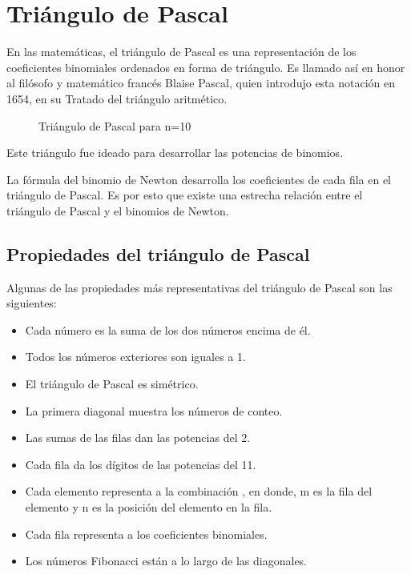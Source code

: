 \section{Triángulo de Pascal}

En las matemáticas, el triángulo de Pascal es una representación de los
coeficientes binomiales ordenados en forma de triángulo. Es llamado así en honor
al filósofo y matemático francés Blaise Pascal, quien introdujo esta notación en
1654, en su Tratado del triángulo aritmético.

\newcommand{\pasc}[2]{
	\pgfkeys{/pgf/fpu}
	\pgfmathparse{round(#1!/((#1-#2)!*#2!))}
	\pgfmathfloattoint{\pgfmathresult}
	\pgfmathresult
}

\begin{figure}[h]
	\centering
	\caption{Triángulo de Pascal para n=10}
	\label{fig:pascalTriangle}
\end{figure}

Este triángulo fue ideado para desarrollar las potencias de binomios.

La fórmula del binomio de Newton desarrolla los coeficientes de cada fila en el
triángulo de Pascal. Es por esto que existe una estrecha relación entre el
triángulo de Pascal y el binomios de Newton.

\subsection{Propiedades del triángulo de Pascal}

Algunas de las propiedades más representativas del triángulo de Pascal son las
siguientes:

\begin{itemize}
	\item Cada número es la suma de los dos números encima de él.
	\item Todos los números exteriores son iguales a 1.
	\item El triángulo de Pascal es simétrico.
	\item La primera diagonal muestra los números de conteo.
	\item Las sumas de las filas dan las potencias del 2.
	\item Cada fila da los dígitos de las potencias del 11.
	\item Cada elemento representa a la combinación , en donde, m es la fila del elemento y n es la posición del elemento en la fila.
	\item Cada fila representa a los coeficientes binomiales.
	\item Los números Fibonacci están a lo largo de las diagonales.
\end{itemize}

